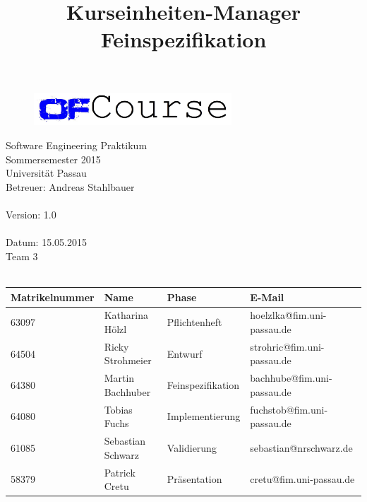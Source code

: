 \documentclass[a4paper, 12pt]{scrreprt}
\begin{document}
	\thispagestyle{plain}

\begin{titlepage}
    \begin{center}
        \begin{figure}[ht]
            \centering
            \includegraphics[width=0.66\textwidth, angle=0]{logo/name_blau_ofCourse.jpg}
        \end{figure}

    	\begin{title}
        	\title{\Huge{\textbf{Kurseinheiten-Manager \\ Feinspezifikation\\}}}

		\end{title}
		\hspace{3cm}

        	Software Engineering Praktikum \\
        	Sommersemester 2015\\
        	Universität Passau\\


        	Betreuer: Andreas Stahlbauer \\
        	\hspace{1,5cm}\\
        	Version: 1.0 \\
        	\hspace{1,5cm}\\
        	Datum: 15.05.2015\\[50pt]
        	Team 3 \\
    
		    \ \\
        
        \begin{tabular}{ | l | l | l | l |}
        	\hline
        	\textbf{Matrikelnummer} & \textbf{Name} & \textbf{Phase} & \textbf{E-Mail}  \\ \hline
        	63097 & Katharina Hölzl & Pflichtenheft & hoelzlka@fim.uni-passau.de \\ \hline
        	64504 & Ricky Strohmeier& Entwurf & strohric@fim.uni-passau.de  \\ \hline
        	64380 & Martin Bachhuber & Feinspezifikation  & bachhube@fim.uni-passau.de \\ \hline
        	64080 & Tobias Fuchs & Implementierung  &  fuchstob@fim.uni-passau.de\\ \hline
        	61085 & Sebastian Schwarz & Validierung & sebastian@nrschwarz.de \\ \hline  
        	58379 & Patrick Cretu  &  Präsentation & cretu@fim.uni-passau.de \\ \hline
        \end{tabular}
        

\end{center}
\end{titlepage}
\end{document}
